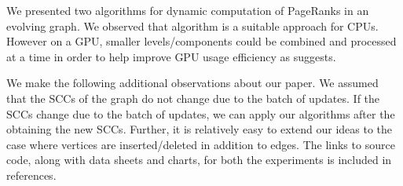 We presented two algorithms for dynamic computation of PageRanks in an evolving graph. We observed that \levelwisePR{} algorithm is a suitable approach for CPUs. However on a GPU, smaller levels/components could be combined and processed at a time in order to help improve GPU usage efficiency as \monolithicPR suggests.

We make the following additional observations about our paper. We assumed that the SCCs of the graph do not change due to the batch of updates. If the SCCs change due to the batch of updates, we can apply our algorithms after the obtaining the new SCCs. Further, it is relatively easy to extend our ideas to the case where vertices are inserted/deleted in addition to edges. The links to source code, along with data sheets and charts, for both the experiments \cite{gh-levl21} is included in references.
